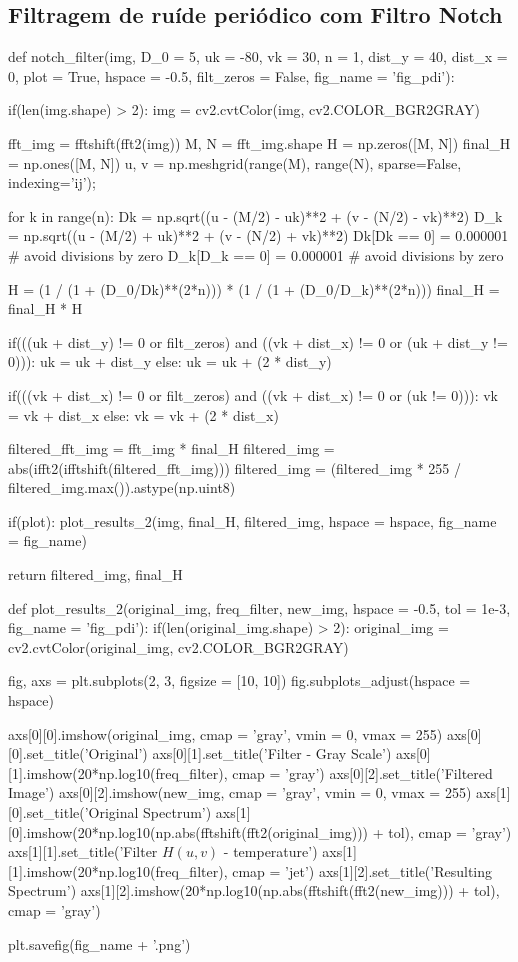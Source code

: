 \documentclass{article}
\begin{document}
\newpage
\subsection{Filtragem de ruíde periódico com Filtro Notch}
\label{cod:notch}
\begin{python}
def notch_filter(img, D_0 = 5, uk = -80, vk = 30, n = 1, dist_y = 40, dist_x = 0, plot = True, 
								 hspace = -0.5, filt_zeros = False, fig_name = 'fig_pdi'):
								 
	if(len(img.shape) > 2):
		img = cv2.cvtColor(img, cv2.COLOR_BGR2GRAY)
	
	fft_img = fftshift(fft2(img)) 
	M, N = fft_img.shape
	H = np.zeros([M, N])
	final_H = np.ones([M, N])
	u, v = np.meshgrid(range(M), range(N), sparse=False, indexing='ij');
	
	for k in range(n):    
		Dk  = np.sqrt((u - (M/2) - uk)**2 + (v - (N/2) - vk)**2)
		D_k = np.sqrt((u - (M/2) + uk)**2 + (v - (N/2) + vk)**2)
		Dk[Dk == 0] = 0.000001 		# avoid divisions by zero
		D_k[D_k == 0] = 0.000001 	# avoid divisions by zero
		
		H = (1 / (1 + (D_0/Dk)**(2*n))) * (1 / (1 + (D_0/D_k)**(2*n)))
		final_H = final_H * H
		
		if(((uk + dist_y) != 0 or filt_zeros) and ((vk + dist_x) != 0 or (uk + dist_y != 0))):
			uk = uk + dist_y
		else:
			uk = uk + (2 * dist_y)
		
		if(((vk + dist_x) != 0 or filt_zeros) and ((vk + dist_x) != 0 or (uk != 0))):
			vk = vk + dist_x
		else:
			vk = vk + (2 * dist_x)
		
	filtered_fft_img = fft_img * final_H
	filtered_img = abs(ifft2(ifftshift(filtered_fft_img)))
	filtered_img = (filtered_img * 255 / filtered_img.max()).astype(np.uint8)
	
	if(plot):
		plot_results_2(img, 
					final_H, 
					filtered_img, 
					hspace = hspace,
					fig_name = fig_name)
	
	return filtered_img, final_H

def plot_results_2(original_img, freq_filter, new_img, hspace = -0.5, tol = 1e-3, fig_name = 'fig_pdi'):
	if(len(original_img.shape) > 2):
		original_img = cv2.cvtColor(original_img, cv2.COLOR_BGR2GRAY)
	
	fig, axs = plt.subplots(2, 3, figsize = [10, 10])
	fig.subplots_adjust(hspace = hspace)
	
	axs[0][0].imshow(original_img, cmap = 'gray', vmin = 0, vmax = 255)
	axs[0][0].set_title('Original')
	axs[0][1].set_title('Filter - Gray Scale')
	axs[0][1].imshow(20*np.log10(freq_filter), cmap = 'gray')
	axs[0][2].set_title('Filtered Image')
	axs[0][2].imshow(new_img, cmap = 'gray', vmin = 0, vmax = 255)
	axs[1][0].set_title('Original Spectrum')
	axs[1][0].imshow(20*np.log10(np.abs(fftshift(fft2(original_img))) + tol), cmap = 'gray')
	axs[1][1].set_title('Filter $H(u, v)$ - temperature')
	axs[1][1].imshow(20*np.log10(freq_filter), cmap = 'jet')
	axs[1][2].set_title('Resulting Spectrum')
	axs[1][2].imshow(20*np.log10(np.abs(fftshift(fft2(new_img))) + tol), cmap = 'gray')
	
	plt.savefig(fig_name + '.png')
\end{python}
\end{document}
